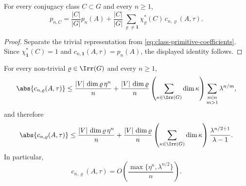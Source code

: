 \begin{lemma}
  \label{lem:class-primitive-trivial-split}
  For every conjugacy class \(C\subset G\) and every \(n\ge 1\),
  \[
    p_{n,C}
    =
    \frac{|C|}{|G|}p_n(A)
    +\frac{|C|}{|G|}
      \sum_{\varrho\neq\mathbf 1}
        \chi_\varrho^\ast(C)\,c_{n,\varrho}(A,\tau).
  \]
\end{lemma}

\begin{proof}
  Separate the trivial representation from
  \eqref{eq:class-primitive-coefficients}. Since
  \(\chi_{\mathbf 1}^\ast(C)=1\) and
  \(c_{n,\mathbf 1}(A,\tau)=p_n(A)\), the displayed identity follows.
\end{proof}

\begin{lemma}
  \label{lem:nontrivial-peter-weyl-channel-bound}
  For every non-trivial \(\varrho\in\Irr(G)\) and every \(n\ge 1\),
  \[
    \abs{c_{n,\varrho}(A,\tau)}
    \le
    \frac{|V|\,\dim\varrho\,\eta^n}{n}
    +\frac{|V|\,\dim\varrho}{n}
      \left(\sum_{\kappa\in\Irr(G)}\dim\kappa\right)
      \sum_{\substack{m\mid n\\ m>1}}\lambda^{n/m},
  \]
  and therefore
  \[
    \abs{c_{n,\varrho}(A,\tau)}
    \le
    \frac{|V|\,\dim\varrho\,\eta^n}{n}
    +\frac{|V|\,\dim\varrho}{n}
      \left(\sum_{\kappa\in\Irr(G)}\dim\kappa\right)
      \frac{\lambda^{n/2+1}}{\lambda-1}.
  \]
  In particular,
  \[
    c_{n,\varrho}(A,\tau)
    =O\!\left(\frac{\max\{\eta^n,\lambda^{n/2}\}}{n}\right).
  \]
\end{lemma}

